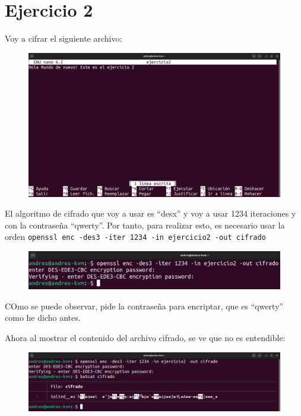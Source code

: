 \documentclass{article}
\begin{document}


\section*{Ejercicio 2}

Voy a cifrar el siguiente archivo:

\begin{figure}[H]
    \includegraphics[width=\textwidth]{imagenes/Captura desde 2022-10-19 17-33-08.png}
\end{figure}

El algoritmo de cifrado que voy a usar es ``desx'' y voy a usar 1234 iteraciones y con la contraseña ``qwerty''. Por tanto, para realizar esto, es necesario usar la orden \verb|openssl enc -des3 -iter 1234 -in ejercicio2 -out cifrado|

\begin{figure}[H]
    \includegraphics[width=\textwidth]{imagenes/Captura desde 2022-10-19 17-44-41.png}
\end{figure}

COmo se puede observar, pide la contraseña para encriptar, que es ``qwerty'' como he dicho antes. 

Ahora al mostrar el contenido del archivo cifrado, se ve que no es entendible:

\begin{figure}[H]
    \includegraphics[width=\textwidth]{imagenes/Captura desde 2022-10-19 17-44-49.png}
\end{figure}
\end{document}
